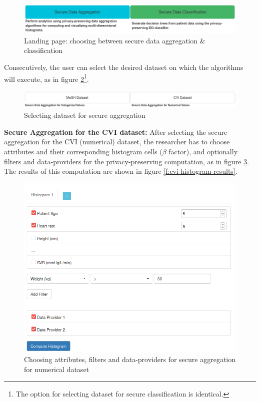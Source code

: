 \begin{figure}[H]
  \centering
  \includegraphics[width=\columnwidth]{figures/landing_buttons.png}
  \caption{Landing page: choosing between secure data aggregation \& classification}
  \label{f:landing-buttons}
\end{figure}

Consecutively, the user can select the desired dataset on which the algorithms will execute, as in figure \ref{f:mesh-cvi}\footnote{The option for selecting dataset for secure classification is identical.}.

\begin{figure}[H]
  \centering
  \includegraphics[width=\columnwidth]{figures/mesh_cvi.png}
  \caption{Selecting dataset for secure aggregation}
  \label{f:mesh-cvi}
\end{figure}



\textbf{Secure Aggregation for the CVI dataset:} After selecting the secure aggregation for the CVI (numerical) dataset, the researcher has to choose attributes and their corresponding histogram cells ($\beta$ factor), and optionally filters and data\hyp providers for the privacy\hyp preserving computation, as in figure \ref{f:cvi-histogram}.
The results of this computation are shown in figure \ref{f:cvi-histogram-results}.

\begin{figure}[H]
  \centering
  \includegraphics[width=0.8\columnwidth]{figures/cvi_histogram.png}
  \caption{Choosing attributes, filters and data\hyp providers for secure aggregation for numerical dataset}
  \label{f:cvi-histogram}
\end{figure}

